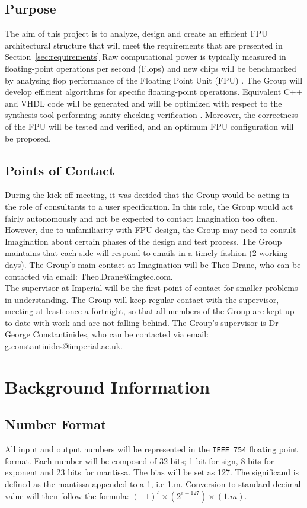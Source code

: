 \documentclass[11pt]{report}
\begin{document}
\subsection{Purpose}
\noindent
The aim of this project is to analyze, design and create an efficient FPU architectural structure that will meet the requirements that are presented in Section~\ref{sec:requirements} Raw computational power is typically measured in floating-point operations per second (Flops) and new chips will be benchmarked by analysing flop performance of the Floating Point Unit (FPU) \cite{designHandout}. The Group will develop efficient algorithms for specific floating-point operations. Equivalent C++ and VHDL code will be generated and will be optimized with respect to the synthesis tool performing sanity checking verification \cite{designHandout}. Moreover, the correctness of the FPU will be tested and verified, and an optimum FPU configuration will be proposed.\\

\subsection{Points of Contact}
\noindent
During the kick off meeting, it was decided that the Group would be acting in the role of consultants to a user specification. In this role, the Group would act fairly autonomously and not be expected to contact Imagination too often. However, due to unfamiliarity with FPU design, the Group may need to consult Imagination about certain phases of the design and test process. The Group maintains that each side will respond to emails in a timely fashion (2 working days). The Group's main contact at Imagination will be Theo Drane, who can be contacted via email: Theo.Drane@imgtec.com.\\

\noindent
The supervisor at Imperial will be the first point of contact for smaller problems in understanding. The Group will keep regular contact with the supervisor, meeting at least once a fortnight, so that all members of the Group are kept up to date with work and are not falling behind. The Group's supervisor is Dr George Constantinides, who can be contacted via email: g.constantinides@imperial.ac.uk.\\


\section{Background Information}
\subsection{Number Format}\label{sec:numFormat}
\noindent
All input and output numbers will be represented in the \texttt{IEEE 754} floating point format. Each number will be composed of 32 bits; 1 bit for sign, 8 bits for exponent and 23 bits for mantissa. The bias will be set as 127. The significand is defined as the mantissa appended to a 1, i.e 1.m. Conversion to standard decimal value will then follow the formula: $(-1)^{s} \times (2^{e - 127}) \times (1.m)$.\\
\end{document}
